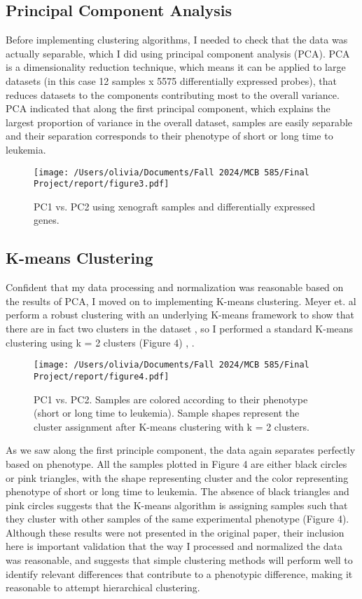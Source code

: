 \documentclass{article}
\begin{document}
\subsection{Principal Component Analysis}
Before implementing clustering algorithms, I needed to check that the data was actually separable, which I did using principal component analysis (PCA). PCA is a dimensionality reduction technique, which means it can be applied to large datasets (in this case 12 samples x 5575 differentially expressed probes), that reduces datasets to the components contributing most to the overall variance. PCA indicated that along the first principal component, which explains the largest proportion of variance in the overall dataset, samples are easily separable and their separation corresponds to their phenotype of short or long time to leukemia. 

\begin{figure}[H]
    \centering
    \texttt{[image: /Users/olivia/Documents/Fall 2024/MCB 585/Final Project/report/figure3.pdf]}
    \caption{PC1 vs. PC2 using xenograft samples and differentially expressed genes.}
    \label{fig:3}
\end{figure}

\subsection{K-means Clustering}
Confident that my data processing and normalization was reasonable based on the results of PCA, I moved on to implementing K-means clustering. Meyer et. al perform a robust clustering with an underlying K-means framework to show that there are in fact two clusters in the dataset \cite{data}, so I performed a standard K-means clustering using k = 2 clusters (Figure 4) \cite{clust_methods}, \cite{kmeans}. 

\begin{figure}[H]
    \centering
    \texttt{[image: /Users/olivia/Documents/Fall 2024/MCB 585/Final Project/report/figure4.pdf]}
    \caption{PC1 vs. PC2. Samples are colored according to their phenotype (short or long time to leukemia). Sample shapes represent the cluster assignment after K-means clustering with k = 2 clusters.}
    \label{fig:4}
\end{figure}

As we saw along the first principle component, the data again separates perfectly based on phenotype. All the samples plotted in Figure 4 are either black circles or pink triangles, with the shape representing cluster and the color representing phenotype of short or long time to leukemia. The absence of black triangles and pink circles suggests that the K-means algorithm is assigning samples such that they cluster with other samples of the same experimental phenotype (Figure 4). Although these results were not presented in the original paper, their inclusion here is important validation that the way I processed and normalized the data was reasonable, and suggests that simple clustering methods will perform well to identify relevant differences that contribute to a phenotypic difference, making it reasonable to attempt hierarchical clustering. 
\end{document}
